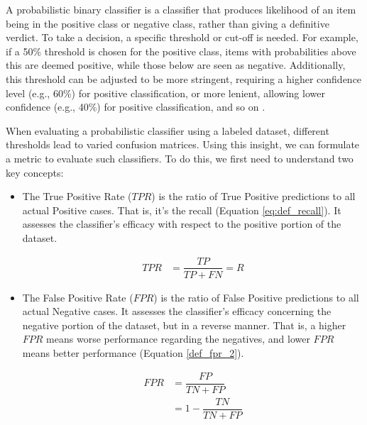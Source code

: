 \label{02_evaluating_probabilistic_classifiers}

A probabilistic binary classifier is a classifier that produces likelihood of an item being in the positive class or negative class, rather than giving a definitive verdict. To take a decision, a specific threshold or cut-off is needed. For example, if a 50\% threshold is chosen for the positive class, items with probabilities above this are deemed positive, while those below are seen as negative. Additionally, this threshold can be adjusted to be more stringent, requiring a higher confidence level (e.g., 60\%) for positive classification, or more lenient, allowing lower confidence (e.g., 40\%) for positive classification, and so on .

When evaluating a probabilistic classifier using a labeled dataset, different thresholds lead to varied confusion matrices. Using this insight, we can formulate a metric to evaluate such classifiers. To do this, we first need to understand two key concepts:


\begin{itemize}
    \item The True Positive Rate ($TPR$) is the ratio of True Positive predictions to all actual Positive cases. That is, it's the recall (Equation \ref{eq:def_recall}). It assesses the classifier's efficacy with respect to the positive portion of the dataset.

    \begin{align}
        TPR &= \dfrac{TP}{TP+FN} =R \label{def_tpr} 
    \end{align}
    
    \item The False Positive Rate ($FPR$) is the ratio of False Positive predictions to all actual Negative cases. It assesses the classifier's efficacy concerning the negative portion of the dataset, but in a reverse manner. That is, a  higher $FPR$ means worse performance regarding the negatives, and lower $FPR$ means better performance (Equation  \ref{def_fpr_2}).
    
    \begin{align}
        FPR &= \dfrac{FP}{TN+FP} \label{def_fpr} \\
            &= 1 - \dfrac{TN}{TN+FP} \label{def_fpr_2}
    \end{align}
    
\end{itemize}


